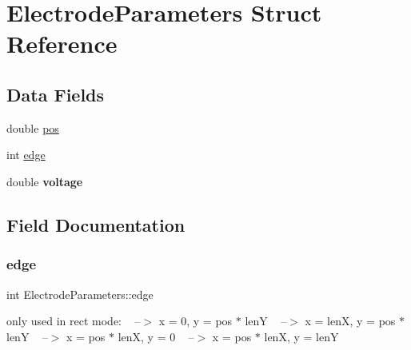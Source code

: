 \hypertarget{structElectrodeParameters}{}\section{Electrode\+Parameters Struct Reference}
\label{structElectrodeParameters}
\subsection*{Data Fields}
\begin{DoxyCompactItemize}
\item 
double \hyperlink{structElectrodeParameters_a028f780d5327403494f536df83052b36}{pos}
\item 
int \hyperlink{structElectrodeParameters_a2f4cf737b66dcd4c7b74a836c9153918}{edge}
\item 
\mbox{\label{structElectrodeParameters_a06d38b1e0195e3d8dbe74a5c7ca72755}} 
double {\bfseries voltage}
\end{DoxyCompactItemize}


\subsection{Field Documentation}
\mbox{\label{structElectrodeParameters_a2f4cf737b66dcd4c7b74a836c9153918}} 
\subsubsection{\texorpdfstring{edge}{edge}}
{\footnotesize\ttfamily int Electrode\+Parameters\+::edge}

only used in rect mode\+: ~ --$>$ x = 0, y = pos $\ast$ lenY ~ --$>$ x = lenX, y = pos $\ast$ lenY ~ --$>$ x = pos $\ast$ lenX, y = 0 ~ --$>$ x = pos $\ast$ lenX, y = lenY \mbox{\label{structElectrodeParameters_a028f780d5327403494f536df83052b36}} 
